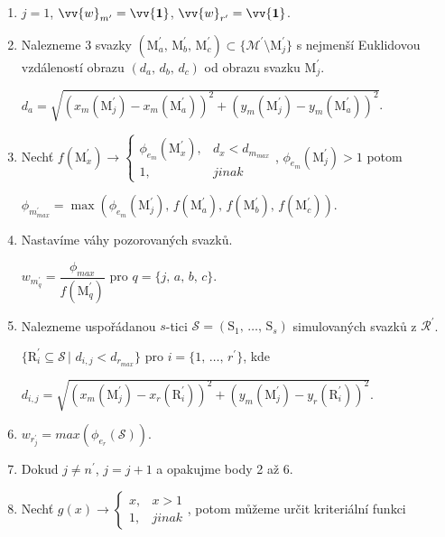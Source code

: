 \begin{enumerate}
\item $j = 1$, $\vv{w}_{m^\prime} = \vv{\mathbf{1}}$, $\vv{w}_{r^\prime} = \vv{\mathbf{1}}$. 

\item Nalezneme 3 svazky $\left(\mathrm{M}^\prime_a,\,\mathrm{M}^\prime_b,\,\mathrm{M}^\prime_c \right) \subset \lbrace \mathcal{M}^\prime\setminus \mathrm{M}^\prime_j\rbrace$ s nejmenší Euklidovou vzdáleností obrazu $\left(d_a,\,d_b,\,d_c\right)$ od obrazu svazku $\mathrm{M}^\prime_j$.

$d_a = \sqrt{\left( x_{m}(\mathrm{M}_j^\prime) -  x_{m}(\mathrm{M}_a^\prime) \right)^2 + \left( y_{m}(\mathrm{M}_j^\prime) -  y_{m}(\mathrm{M}_a^\prime) \right)^2}$.

\item Nechť $f(\mathrm{M}^\prime_x)\rightarrow \begin{cases}
\phi_{e_{m}}\left(\mathrm{M}^\prime_x \right), & d_x < d_{m_{max}}\\
1, & jinak
\end{cases}$, $\phi_{e_{m}}(\mathrm{M}^\prime_j) > 1 $ potom 

$\phi_{m^\prime_{max}} = \max\left(\phi_{e_{m}}(\mathrm{M}^\prime_j),\,f(\mathrm{M}^\prime_a),\,f(\mathrm{M}^\prime_b),\,f(\mathrm{M}^\prime_c)  \right)$. 

\item Nastavíme váhy pozorovaných svazků.

 $w_{m^\prime_{q}} = \dfrac{\phi_{max}}{f(\mathrm{M}^\prime_q)}$ pro $q = \lbrace j,\,a,\,b,\,c \rbrace$.
 
\item Nalezneme uspořádanou $s$-tici $\mathcal{S} = (\mathrm{S}_1,\,\dots,\,\mathrm{S}_s)$ simulovaných svazků z $\mathcal{R}^\prime$. 

$\lbrace \mathrm{R}^\prime_i \subseteq \mathcal{S}\,|\,\, d_{i,j} < d_{r_{max}}  \rbrace$ pro $i = \lbrace 1,\,\dots,\, r^\prime \rbrace$, kde 

$d_{i,j} = \sqrt{\left( x_{m}(\mathrm{M}_j^\prime) -  x_{r}(\mathrm{R}_i^\prime) \right)^2 + \left( y_{m}(\mathrm{M}_j^\prime) -  y_{r}(\mathrm{R}_i^\prime) \right)^2}$.

\item $w_{r^\prime_j} = max\left( \phi_{e_r}(\mathcal{S}) \right)$.

\item Dokud $j \neq n^\prime$, $j = j+1$ a opakujme body 2 až 6. 

\item Nechť  $g(x)\rightarrow \begin{cases}
x, & x > 1\\
1, & jinak
\end{cases}$, potom můžeme určit kriteriální funkci 


\end{enumerate}
